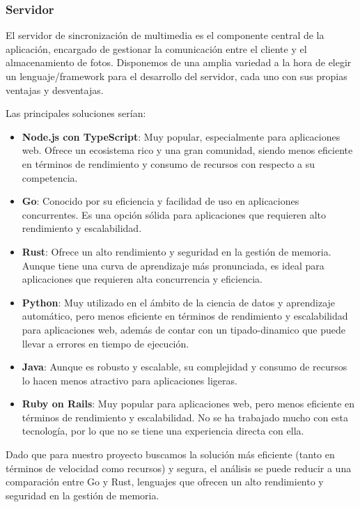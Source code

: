 \subsubsection{Servidor}
El servidor de sincronización de multimedia es el componente central de la aplicación, encargado de gestionar la comunicación entre el cliente y el almacenamiento de fotos.
Disponemos de una amplia variedad a la hora de elegir un lenguaje/\gls{framework} para el desarrollo del servidor, cada uno con sus propias ventajas y desventajas.

Las principales soluciones serían:
\begin{itemize}
    \item \textbf{Node.js con TypeScript}: Muy popular, especialmente para aplicaciones web. Ofrece un ecosistema rico y una gran comunidad, siendo menos eficiente en términos de rendimiento y consumo de recursos con respecto a su competencia.
    \item \textbf{Go}: Conocido por su eficiencia y facilidad de uso en aplicaciones concurrentes. Es una opción sólida para aplicaciones que requieren alto rendimiento y escalabilidad.
    \item \textbf{Rust}: Ofrece un alto rendimiento y seguridad en la gestión de memoria. Aunque tiene una curva de aprendizaje más pronunciada, es ideal para aplicaciones que requieren alta concurrencia y eficiencia.
    \item \textbf{Python}: Muy utilizado en el ámbito de la ciencia de datos y aprendizaje automático, pero menos eficiente en términos de rendimiento y escalabilidad para aplicaciones web, además de contar con un \gls{tipado-dinamico} que puede llevar a errores en tiempo de ejecución.
    \item \textbf{Java}: Aunque es robusto y escalable, su complejidad y consumo de recursos lo hacen menos atractivo para aplicaciones ligeras.
    \item \textbf{Ruby on Rails}: Muy popular para aplicaciones web, pero menos eficiente en términos de rendimiento y escalabilidad. No se ha trabajado mucho con esta tecnología, por lo que no se tiene una experiencia directa con ella.
\end{itemize}

Dado que para nuestro proyecto buscamos la solución más eficiente (tanto en términos de velocidad como recursos) y segura, el análisis se puede reducir a una comparación entre Go y Rust, lenguajes que ofrecen un alto rendimiento y seguridad en la gestión de memoria.

